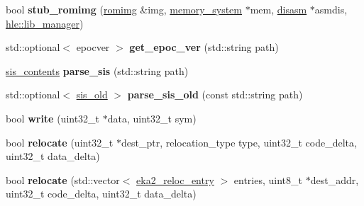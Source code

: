 \begin{DoxyCompactItemize}
\item 
\mbox{\label{namespaceeka2l1_1_1loader_a5e521c7d05b6530bb8b6e948f57b910b}} 
bool {\bfseries stub\+\_\+romimg} (\mbox{\hyperlink{structeka2l1_1_1loader_1_1romimg}{romimg}} \&img, \mbox{\hyperlink{classeka2l1_1_1memory__system}{memory\+\_\+system}} $\ast$mem, \mbox{\hyperlink{classeka2l1_1_1disasm}{disasm}} $\ast$asmdis, \mbox{\hyperlink{classeka2l1_1_1hle_1_1lib__manager}{hle\+::lib\+\_\+manager}})
\item 
\mbox{\label{namespaceeka2l1_1_1loader_ac7117a7f557313022cc79e973b65dfdc}} 
std\+::optional$<$ epocver $>$ {\bfseries get\+\_\+epoc\+\_\+ver} (std\+::string path)
\item 
\mbox{\label{namespaceeka2l1_1_1loader_ac1da31fdac75881c8e06e9c79baa74ef}} 
\mbox{\hyperlink{structeka2l1_1_1loader_1_1sis__contents}{sis\+\_\+contents}} {\bfseries parse\+\_\+sis} (std\+::string path)
\item 
\mbox{\label{namespaceeka2l1_1_1loader_a10ba8476f734b98f9b6a6ffb3af99629}} 
std\+::optional$<$ \mbox{\hyperlink{structeka2l1_1_1loader_1_1sis__old}{sis\+\_\+old}} $>$ {\bfseries parse\+\_\+sis\+\_\+old} (const std\+::string path)
\item 
\mbox{\label{namespaceeka2l1_1_1loader_a900455a968961490ef98c94c4ce6d2b2}} 
bool {\bfseries write} (uint32\+\_\+t $\ast$data, uint32\+\_\+t sym)
\item 
\mbox{\label{namespaceeka2l1_1_1loader_a5a2d3d73f045562787edaa90e248b30a}} 
bool {\bfseries relocate} (uint32\+\_\+t $\ast$dest\+\_\+ptr, relocation\+\_\+type type, uint32\+\_\+t code\+\_\+delta, uint32\+\_\+t data\+\_\+delta)
\item 
\mbox{\label{namespaceeka2l1_1_1loader_af128a6eb21eceaecc1359ee6b452dfdb}} 
bool {\bfseries relocate} (std\+::vector$<$ \mbox{\hyperlink{structeka2l1_1_1loader_1_1eka2__reloc__entry}{eka2\+\_\+reloc\+\_\+entry}} $>$ entries, uint8\+\_\+t $\ast$dest\+\_\+addr, uint32\+\_\+t code\+\_\+delta, uint32\+\_\+t data\+\_\+delta)
\item 
\mbox{\label{namespaceeka2l1_1_1loader_a19302985422b52548311642ecd6e904a}} 

\end{DoxyCompactItemize}

